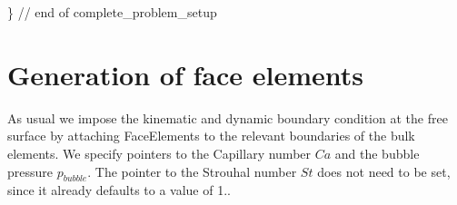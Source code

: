 \begin{DoxyCodeInclude}
\} \textcolor{comment}{// end of complete\_problem\_setup}

\end{DoxyCodeInclude}




 

\hypertarget{index_face_elements}{}\section{Generation of face elements}\label{index_face_elements}
As usual we impose the kinematic and dynamic boundary condition at the free surface by attaching {\ttfamily Face\+Elements} to the relevant boundaries of the bulk elements. We specify pointers to the Capillary number $ Ca $ and the bubble pressure $ p_{bubble} $. The pointer to the Strouhal number $ St $ does not need to be set, since it already defaults to a value of 1..

